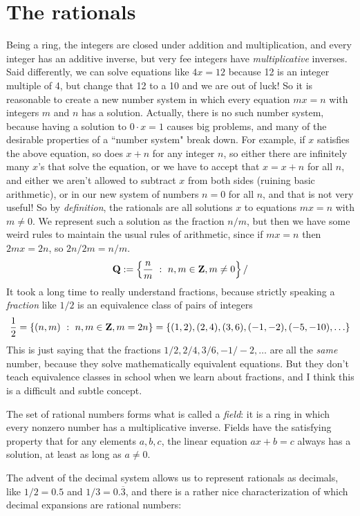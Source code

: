\documentclass[11pt,oneside]{amsart}
\begin{document}
\section{The rationals}

Being a ring, the integers are closed under addition and multiplication, and every integer has an additive inverse, but very fee integers
have {\em multiplicative} inverses.  Said differently, we can solve equations like $4x = 12$ because 12 is an integer multiple of 4, 
but change that 12 to a 10 and we are out of luck!  So it is reasonable to create a new number system in which every equation $mx=n$
with integers $m$ and $n$ has a solution.  Actually, there is no such number system, because having a solution to $0\cdot x = 1$
causes big problems, and many of the desirable properties of a ``number system" break down.  For example, if $x$ satisfies the above equation,
so does $x+n$ for any integer $n$, so either there are infinitely many $x$'s that solve the equation, or we have to accept that $x=x+n$ for all $n$,
and either we aren't allowed to subtract $x$ from both sides (ruining basic arithmetic), or in our new system of numbers $n=0$ for all $n$,
and that is not very useful!  So by {\em definition}, the rationals are all solutions $x$ to equations $mx=n$ with $m\neq 0$.  We
represent such a solution as the fraction $n/m$, but then we have some weird rules to maintain the usual rules of arithmetic,
since if $mx=n$ then $2mx = 2n$, so $2n/2m = n/m$.  
$$
	\mathbf{Q}:=\left\{\frac{n}{m}\ :\ n,m\in \mathbf{Z}, m\neq 0\right\}/
$$
It took a long time to really understand fractions, because strictly speaking a {\em fraction} like $1/2$ is an equivalence class of pairs of integers
$$
	\frac{1}{2} = \{ (n,m)\ :\ n,m\in \mathbf{Z}, m=2n \} = \{ (1,2), (2,4), (3,6), (-1,-2), (-5,-10),\ldots\}
$$
This is just saying that the fractions ${1/2}, 2/4, 3/6, -1/-2,\ldots$ are all the {\em same} number, because they solve mathematically equivalent
equations.  But they don't teach equivalence classes in school when we learn about fractions, and I think this is a difficult and subtle concept.

The set of rational numbers forms what is called a {\em field}: it is a ring in which every nonzero number has a multiplicative inverse.
Fields have the satisfying property that for any elements $a,b,c$, the linear equation $ax+b=c$ always has a solution, at least as long
as $a\neq 0$.

The advent of the decimal system allows us to represent rationals as decimals, like $1/2 = 0.5$ and $1/3 = 0.\overline{3}$,
and there is a rather nice characterization of which decimal expansions are rational numbers: 
\end{document}
